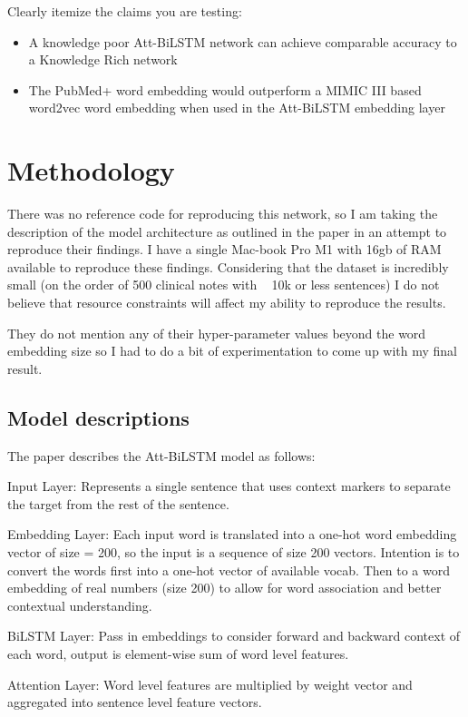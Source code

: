 \documentclass[11pt,a4paper]{article}
\begin{document}
Clearly itemize the claims you are testing:
\begin{itemize}
    \item A knowledge poor Att-BiLSTM network can achieve comparable accuracy to a Knowledge Rich network
    \item The PubMed+ word embedding would outperform a MIMIC III based word2vec word embedding when used in the Att-BiLSTM embedding layer
\end{itemize}


\section{Methodology}

There was no reference code for reproducing this network, so I am taking the description of the model architecture as outlined in the paper in an attempt to reproduce their findings. I have a single Mac-book Pro M1 with 16gb of RAM available to reproduce these findings. Considering that the dataset is incredibly small (on the order of 500 clinical notes with ~ 10k or less sentences) I do not believe that resource constraints will affect my ability to reproduce the results.

They do not mention any of their hyper-parameter values beyond the word embedding size so I had to do a bit of experimentation to come up with my final result.

\subsection{Model descriptions}
The paper describes the Att-BiLSTM model as follows:

Input Layer: Represents a single sentence that uses context markers to separate the target from the rest of the sentence.

Embedding Layer: Each input word is translated into a one-hot word embedding vector of size = 200, so the input is a sequence of size 200 vectors. Intention is to convert the words first into a one-hot vector of available vocab. Then to a word embedding of real numbers (size 200) to allow for word association and better contextual understanding.

BiLSTM Layer: Pass in embeddings to consider forward and backward context of each word, output is element-wise sum of word level features.

Attention Layer: Word level features are multiplied by weight vector and aggregated into sentence level feature vectors.
\end{document}

